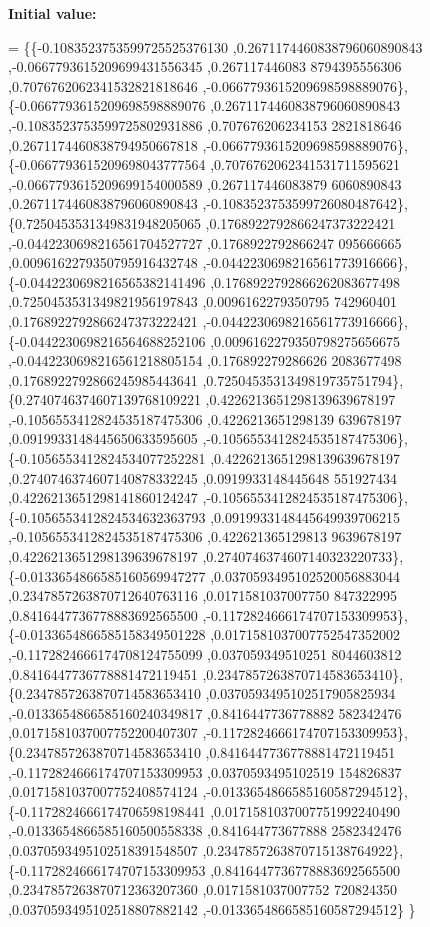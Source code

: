 {\bfseries Initial value\+:}
\begin{DoxyCode}
= \{\{-0.1083523753599725525376130 ,0.2671174460838796060890843 ,-0.0667793615209699431556345 ,0.267117446083
      8794395556306 ,0.7076762062341532821818646 ,-0.0667793615209698598889076\},
\{-0.0667793615209698598889076 ,0.2671174460838796060890843 ,-0.1083523753599725802931886 ,0.707676206234153
      2821818646 ,0.2671174460838794950667818 ,-0.0667793615209698598889076\},
\{-0.0667793615209698043777564 ,0.7076762062341531711595621 ,-0.0667793615209699154000589 ,0.267117446083879
      6060890843 ,0.2671174460838796060890843 ,-0.1083523753599726080487642\},
\{0.7250453531349831948205065 ,0.1768922792866247373222421 ,-0.0442230698216561704527727 ,0.1768922792866247
      095666665 ,0.0096162279350795916432748 ,-0.0442230698216561773916666\},
\{-0.0442230698216565382141496 ,0.1768922792866262083677498 ,0.7250453531349821956197843 ,0.0096162279350795
      742960401 ,0.1768922792866247373222421 ,-0.0442230698216561773916666\},
\{-0.0442230698216564688252106 ,0.0096162279350798275656675 ,-0.0442230698216561218805154 ,0.176892279286626
      2083677498 ,0.1768922792866245985443641 ,0.7250453531349819735751794\},
\{0.2740746374607139768109221 ,0.4226213651298139639678197 ,-0.1056553412824535187475306 ,0.4226213651298139
      639678197 ,0.0919933148445650633595605 ,-0.1056553412824535187475306\},
\{-0.1056553412824534077252281 ,0.4226213651298139639678197 ,0.2740746374607140878332245 ,0.0919933148445648
      551927434 ,0.4226213651298141860124247 ,-0.1056553412824535187475306\},
\{-0.1056553412824534632363793 ,0.0919933148445649939706215 ,-0.1056553412824535187475306 ,0.422621365129813
      9639678197 ,0.4226213651298139639678197 ,0.2740746374607140323220733\},
\{-0.0133654866585160569947277 ,0.0370593495102520056883044 ,0.2347857263870712640763116 ,0.0171581037007750
      847322995 ,0.8416447736778883692565500 ,-0.1172824666174707153309953\},
\{-0.0133654866585158349501228 ,0.0171581037007752547352002 ,-0.1172824666174708124755099 ,0.037059349510251
      8044603812 ,0.8416447736778881472119451 ,0.2347857263870714583653410\},
\{0.2347857263870714583653410 ,0.0370593495102517905825934 ,-0.0133654866585160240349817 ,0.8416447736778882
      582342476 ,0.0171581037007752200407307 ,-0.1172824666174707153309953\},
\{0.2347857263870714583653410 ,0.8416447736778881472119451 ,-0.1172824666174707153309953 ,0.0370593495102519
      154826837 ,0.0171581037007752408574124 ,-0.0133654866585160587294512\},
\{-0.1172824666174706598198441 ,0.0171581037007751992240490 ,-0.0133654866585160500558338 ,0.841644773677888
      2582342476 ,0.0370593495102518391548507 ,0.2347857263870715138764922\},
\{-0.1172824666174707153309953 ,0.8416447736778883692565500 ,0.2347857263870712363207360 ,0.0171581037007752
      720824350 ,0.0370593495102518807882142 ,-0.0133654866585160587294512\}
\}
\end{DoxyCode}
\mbox{\label{a00449_aa6bad8dc5fb3243e265e9ebb9061cdcc}} 
